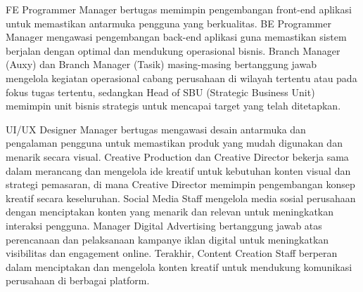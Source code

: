 FE Programmer Manager bertugas memimpin pengembangan front-end aplikasi untuk memastikan antarmuka pengguna yang berkualitas. BE Programmer Manager mengawasi pengembangan back-end aplikasi guna memastikan sistem berjalan dengan optimal dan mendukung operasional bisnis. Branch Manager (Auxy) dan Branch Manager (Tasik) masing-masing bertanggung jawab mengelola kegiatan operasional cabang perusahaan di wilayah tertentu atau pada fokus tugas tertentu, sedangkan Head of SBU (Strategic Business Unit) memimpin unit bisnis strategis untuk mencapai target yang telah ditetapkan.

UI/UX Designer Manager bertugas mengawasi desain antarmuka dan pengalaman pengguna untuk memastikan produk yang mudah digunakan dan menarik secara visual. Creative Production dan Creative Director bekerja sama dalam merancang dan mengelola ide kreatif untuk kebutuhan konten visual dan strategi pemasaran, di mana Creative Director memimpin pengembangan konsep kreatif secara keseluruhan. Social Media Staff mengelola media sosial perusahaan dengan menciptakan konten yang menarik dan relevan untuk meningkatkan interaksi pengguna. Manager Digital Advertising bertanggung jawab atas perencanaan dan pelaksanaan kampanye iklan digital untuk meningkatkan visibilitas dan engagement online. Terakhir, Content Creation Staff berperan dalam menciptakan dan mengelola konten kreatif untuk mendukung komunikasi perusahaan di berbagai platform.
